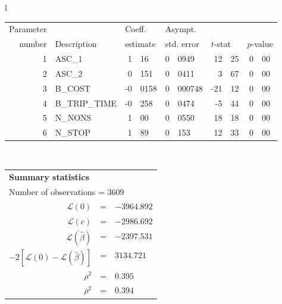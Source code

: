   \begin{tabular}{l}
\begin{tabular}{rlr@{.}lr@{.}lr@{.}lr@{.}l}
Parameter &                       &   \multicolumn{2}{l}{Coeff.}      & \multicolumn{2}{l}{Asympt.}  &     \multicolumn{4}{l}{}   \\
number &  Description                     &   \multicolumn{2}{l}{estimate}      & \multicolumn{2}{l}{std. error}  &   \multicolumn{2}{l}{$t$-stat}  &   \multicolumn{2}{l}{$p$-value}   \\

\hline

1 & ASC\_1 & 1&16 & 0&0949 & 12&25 & 0&00 \\
2 & ASC\_2 & 0&151 & 0&0411 & 3&67 & 0&00 \\
3 & B\_COST & -0&0158 & 0&000748 & -21&12 & 0&00 \\
4 & B\_TRIP\_TIME & -0&258 & 0&0474 & -5&44 & 0&00 \\
\hline
5 & N\_NONS & 1&00 & 0&0550 & 18&18\footnotemark[1] & 0&00 \\
6 & N\_STOP & 1&89 & 0&153 & 12&33\footnotemark[1] & 0&00 \\
\hline

\end{tabular}
\\
\begin{tabular}{rcl}
\multicolumn{3}{l}{\bf Summary statistics}\\
\multicolumn{3}{l}{ Number of observations = $3609$} \\
 $\mathcal{L}(0)$ &=&  $-3964.892$ \\
 $\mathcal{L}(c)$ &=& $-2986.692$\\
 $\mathcal{L}(\hat{\beta})$ &=& $-2397.531 $  \\
 $-2[\mathcal{L}(0) -\mathcal{L}(\hat{\beta})]$ &=& $3134.721$ \\
    $\rho^2$ &=&   $0.395$ \\
    $\bar{\rho}^2$ &=&    $0.394$ \\
\end{tabular}
\end{tabular}

